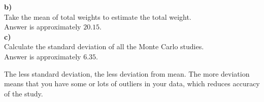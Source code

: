 \documentclass[12pt]{article}
\begin{document}
\textbf{b)}\\
Take the mean of total weights to estimate the total weight.\\

Answer is approximately $20.15$.\\

\textbf{c)}\\
Calculate the standard deviation of all the Monte Carlo studies.\\

Answer is approximately $6.35$.

The less standard deviation, the less deviation from mean. The more deviation means that you have some or lots of outliers in your data, which reduces accuracy of the study.
\end{document}
